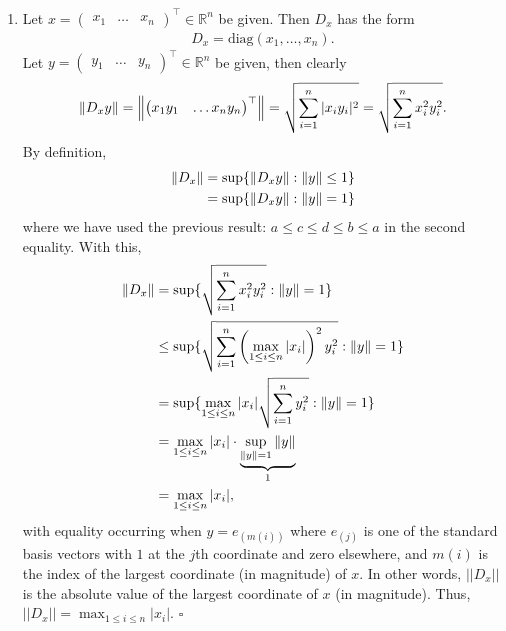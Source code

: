 \documentclass{article}
\begin{document}
\begin{enumerate}
	\item  Let ${x} = \begin{pmatrix}
	x_1 & \dots & x_n
	\end{pmatrix}^\top \in \mathbb{R}^n$ be given. Then $D_x$ has the form
	\begin{align*}
	D_x = \text{diag}(x_1,\dots,x_n).
	\end{align*} 
	Let ${y} = \begin{pmatrix}
	y_1 & \dots & y_n
	\end{pmatrix}^\top \in \mathbb{R}^n$ be given, then clearly 
	\begin{align*}
	\norm{ D_xy} = \norm{ \begin{pmatrix}
	x_1 y_1 & \dots x_ny_n
	\end{pmatrix}^\top}= \sqrt{ \sum^n_{i=1}|x_i y_i|^2  }  = \sqrt{\sum^n_{i=1} x_i^2 y_i^2}.
	\end{align*}
	By definition, 
	\begin{align*}
	\norm{ D_x } &= \sup \{\norm{ D_x y} : \norm{y} \leq 1 \}\nonumber\\
	&= \sup \{\norm{D_x y} : \norm{y} = 1\}
	\end{align*}
	where we have used the previous result: $a \leq c \leq d \leq b \leq a$ in the second equality. With this,
	\begin{align*}
	\norm{ D_x } &= \sup \{\sqrt{\sum^n_{i=1} x_i^2 y_i^2} : \norm{y} = 1\}\nonumber\\
	&\leq \sup \{ \sqrt{\sum^n_{i=1} \left(\max_{1\leq i \leq n} |x_i|\right)^2  y_i^2} : \norm{y} = 1 \}  \nonumber\\
	&= \sup \{\max_{1\leq i \leq n} |x_i| \sqrt{\sum^n_{i=1} y_i^2} : \norm{y} = 1 \}  \nonumber\\
	&= \max_{1\leq i \leq n} |x_i| \cdot \underbrace{\sup_{\norm{y}=1}\norm{y}}_{1}\nonumber\\
	&= \max_{1\leq i \leq n} |x_i|,
	\end{align*}
	with equality occurring when $y = e_{(m(i))}$ where $e_{(j)}$ is one of the standard basis vectors with $1$ at the $j$th coordinate and zero elsewhere, and $m(i)$ is the index of the largest coordinate (in magnitude) of $x$. In other words, $||D_x||$ is the absolute value of the largest coordinate of $x$ (in magnitude). Thus, $||D_x|| = \max_{1\leq i \leq n}|x_i|$. \hfill $\square$
	
	
	

\end{enumerate}
\end{document}
